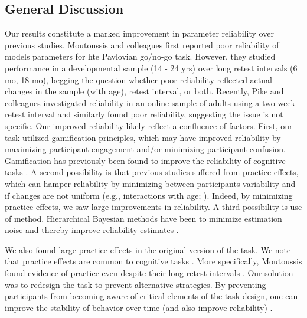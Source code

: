 \documentclass[a4paper,12pt]{article}
\begin{document}
\begin{refsection}[main]
\section*{General Discussion}

Our results constitute a marked improvement in parameter reliability over previous studies. Moutoussis and colleagues \cite{moutoussis2018change} first reported poor reliability of models parameters for hte Pavlovian go/no-go task. However, they studied performance in a developmental sample (14 - 24 yrs) over long retest intervals (6 mo, 18 mo), begging the question whether poor reliability reflected actual changes in the sample (with age), retest interval, or both. Recently, Pike and colleagues \cite{pike2022test} investigated reliability in an online sample of adults using a two-week retest interval and similarly found poor reliability, suggesting the issue is not specific. Our improved reliability likely reflect a confluence of factors. First, our task utilized gamification principles, which may have improved reliability by maximizing participant engagement and/or minimizing participant confusion. Gamification has previously been found to improve the reliability of cognitive tasks \cite{kucina2022solution, verdejo2021unified}. A second possibility is that previous studies suffered from practice effects, which can hamper reliability by minimizing between-participants variability and if changes are not uniform (e.g., interactions with age; \cite{anokhin2022age}). Indeed, by minimizing practice effects, we saw large improvements in reliability. A third possibility is use of method. Hierarchical Bayesian methods have been to minimize estimation noise and thereby improve reliability estimates \cite{brown2020improving, waltmann2022sufficient}. 

We also found large practice effects in the original version of the task. We note that practice effects are common to cognitive tasks \cite{hausknecht2007retesting, scharfen2018retest}. More specifically, Moutoussis found evidence of practice even despite their long retest intervals \cite{moutoussis2018change}. Our solution was to redesign the task to prevent alternative strategies. By preventing participants from becoming aware of critical elements of the task design, one can improve the stability of behavior over time (and also improve reliability) \cite{mclean2018towards}. 



\end{refsection}
\end{document}
